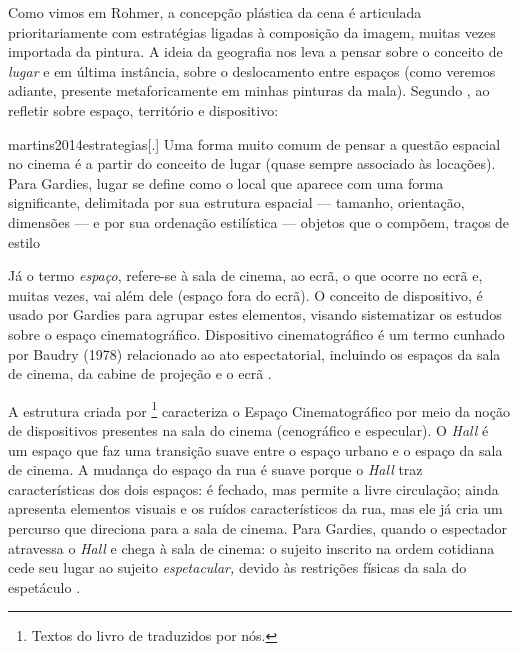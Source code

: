 Como vimos em Rohmer, a concepção plástica da cena é articulada
prioritariamente com estratégias ligadas à composição da imagem, muitas
vezes importada da pintura. A ideia da geografia nos leva a pensar
sobre o conceito de \emph{lugar} e em última instância, sobre o
deslocamento entre espaços (como veremos adiante, presente
metaforicamente em minhas pinturas da mala). Segundo
\textcite{martins2014estrategias}, ao refletir sobre espaço, território
e dispositivo:

\begin{displaycquote}[9]{martins2014estrategias}[.]
	Uma forma muito comum de pensar a questão espacial no cinema é a partir
	do conceito de lugar (quase sempre associado às locações). Para Gardies,
	lugar se define como o local que aparece com uma forma significante,
	delimitada por sua estrutura espacial --- tamanho, orientação, dimensões
	--- e por sua ordenação estilística --- objetos que o compõem, traços de
	estilo
\end{displaycquote}

Já o termo \emph{espaço}, refere-se à sala de cinema, ao ecrã, o que
ocorre no ecrã e, muitas vezes, vai além dele (espaço fora do ecrã). O
conceito de dispositivo, é usado por Gardies para agrupar estes
elementos, visando sistematizar os estudos sobre o espaço
cinematográfico. Dispositivo cinematográfico é um termo cunhado por
Baudry (1978) relacionado ao ato espectatorial, incluindo os espaços da
sala de cinema, da cabine de projeção e o ecrã \parencite{martins2014estrategias}.

A estrutura criada por \textcite{gardies2019espaco}\footnote{Textos do
	livro de \textcite{gardies2019espaco} traduzidos por nós.} caracteriza
o Espaço Cinematográfico por meio da noção de dispositivos presentes na
sala do cinema (cenográfico e especular). O \emph{Hall} é um espaço que
faz uma transição suave entre o espaço urbano e o espaço da sala de
cinema. A mudança do espaço da rua é suave porque o \emph{Hall} traz
características dos dois espaços: é fechado, mas permite a livre
circulação; ainda apresenta elementos visuais e os ruídos
característicos da rua, mas ele já cria um percurso que direciona para
a sala de cinema. Para Gardies, quando o espectador atravessa o
\emph{Hall} e chega à sala de cinema: o sujeito inscrito na ordem
cotidiana cede seu lugar ao sujeito \emph{espetacular,} devido às
restrições físicas da sala do espetáculo \parencite[18-20]{gardies2019espaco}.

